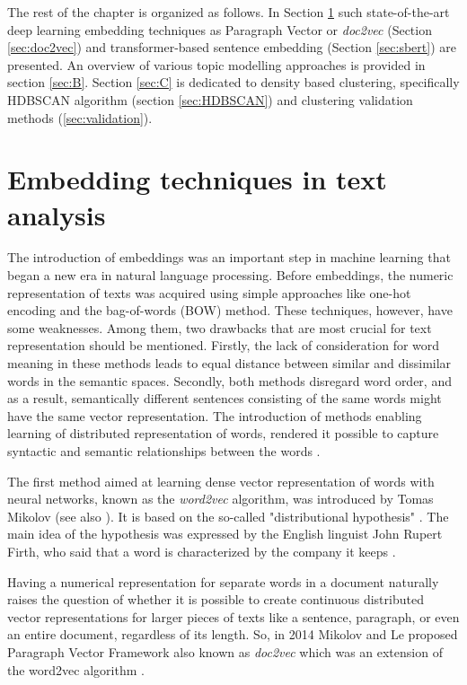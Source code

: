 \documentclass[fontsize=12pt,a4paper,twoside,openany]{scrbook}
\begin{document}
The rest of the chapter is organized as follows. In Section \ref{sec:A} such state-of-the-art deep learning embedding techniques as Paragraph Vector or \emph{doc2vec} (Section \ref{sec:doc2vec}) and transformer-based sentence embedding (Section \ref{sec:sbert}) are presented. An overview of various topic modelling approaches is provided in section \ref{sec:B}. Section \ref{sec:C} is dedicated to density based clustering, specifically HDBSCAN algorithm (section \ref{sec:HDBSCAN}) and clustering validation methods (\ref{sec:validation}).  

\section{Embedding techniques in text analysis}
\label{sec:A}

The introduction of embeddings was an important step in machine learning that began a new era in natural language processing. Before embeddings, the numeric representation of texts was acquired using simple approaches like one-hot encoding and the bag-of-words (BOW) method. These techniques, however, have some weaknesses. Among them, two drawbacks that are most crucial for text representation should be mentioned. Firstly, the lack of consideration for word meaning in these methods leads to equal distance between similar and dissimilar words in the semantic spaces. Secondly, both methods disregard word order, and as a result, semantically different sentences consisting of the same words might have the same vector representation. The introduction of methods enabling learning of distributed representation of words, rendered it possible to capture syntactic and semantic relationships between the words \parencite{Le14}. 

The first method aimed at learning dense vector representation of words with neural networks, known as the \emph{word2vec} algorithm, was introduced by Tomas Mikolov \parencite{TMikolov13} (see also \parencite{Mikolov13}). It is based on the so-called "distributional hypothesis" \parencite{Harris54}. The main idea of the hypothesis was expressed by the English linguist John Rupert Firth, who said that a word is characterized by the company it keeps \parencite{Firth57}.

Having a numerical representation for separate words in a document naturally raises the question of whether it is possible to create continuous distributed vector representations for larger pieces of texts like a sentence, paragraph, or even an entire document, regardless of its length. So, in 2014 Mikolov and Le proposed Paragraph Vector Framework also known as \emph{doc2vec} which was an extension of the word2vec algorithm \parencite[see][]{Le14}.
\end{document}
